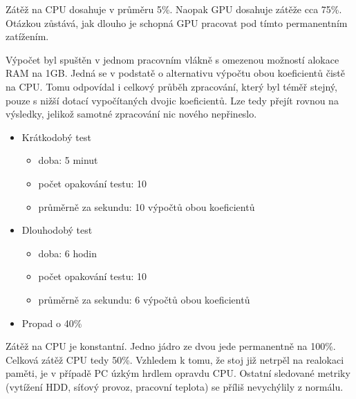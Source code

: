 Zátěž na CPU dosahuje v průměru 5\%. Naopak GPU dosahuje zátěže cca 75\%. Otázkou zůstává, jak dlouho je schopná GPU pracovat pod tímto permanentním zatížením.

Výpočet byl spuštěn v jednom pracovním vlákně s omezenou možností alokace RAM na 1GB. Jedná se v podstatě o alternativu výpočtu obou koeficientů čistě na CPU. Tomu odpovídal i celkový průběh zpracování, který byl téměř stejný, pouze s nižší dotací vypočítaných dvojic koeficientů.
Lze tedy přejít rovnou na výsledky, jelikož samotné zpracování nic nového nepřineslo.

\begin{itemize}
	\setlength{\parskip}{0pt}
	\setlength{\itemsep}{0pt}
	\item {Krátkodobý test}
	\begin{itemize}
		\setlength{\parskip}{0pt}
		\setlength{\itemsep}{0pt}
		\item {doba: 5 minut}
		\item {počet opakování testu: 10}
		\item {průměrně za sekundu: 10 výpočtů obou koeficientů}
	\end{itemize}
	\item {Dlouhodobý test}
	\begin{itemize}
		\setlength{\parskip}{0pt}
		\setlength{\itemsep}{0pt}
		\item {doba: 6 hodin}
		\item {počet opakování testu: 10}
		\item {průměrně za sekundu: 6 výpočtů obou koeficientů}
	\end{itemize}
	\item {Propad o 40\%}
\end{itemize}

Zátěž na CPU je konstantní. Jedno jádro ze dvou jede permanentně na 100\%. Celková zátěž CPU tedy 50\%. Vzhledem k tomu, že stoj již netrpěl na realokaci paměti, je v případě PC úzkým hrdlem opravdu CPU. Ostatní sledované metriky (vytížení HDD, síťový provoz, pracovní teplota) se příliš nevychýlily z normálu.









